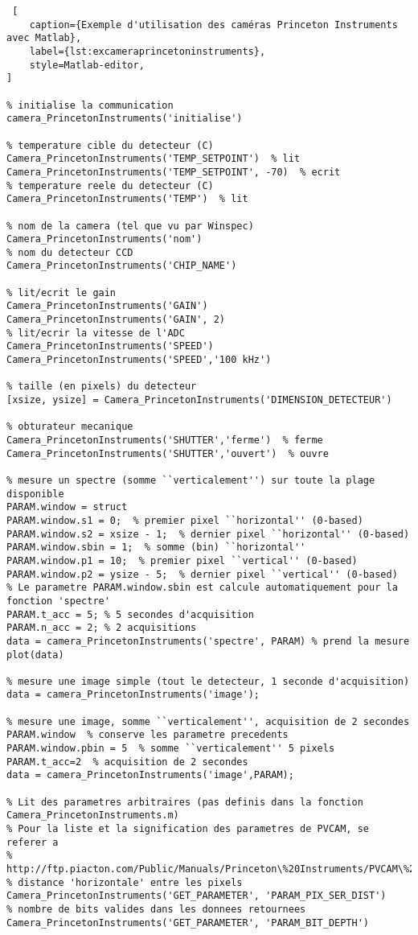 \documentclass[11pt,francais]{book} %
\begin{document}
\begin{lstlisting} [
    caption={Exemple d'utilisation des caméras Princeton Instruments avec Matlab},
    label={lst:excameraprincetoninstruments},
    style=Matlab-editor,
]

% initialise la communication
camera_PrincetonInstruments('initialise')

% temperature cible du detecteur (C)
Camera_PrincetonInstruments('TEMP_SETPOINT')  % lit
Camera_PrincetonInstruments('TEMP_SETPOINT', -70)  % ecrit
% temperature reele du detecteur (C)
Camera_PrincetonInstruments('TEMP')  % lit

% nom de la camera (tel que vu par Winspec)
Camera_PrincetonInstruments('nom')
% nom du detecteur CCD
Camera_PrincetonInstruments('CHIP_NAME')

% lit/ecrit le gain
Camera_PrincetonInstruments('GAIN')
Camera_PrincetonInstruments('GAIN', 2)
% lit/ecrir la vitesse de l'ADC
Camera_PrincetonInstruments('SPEED')
Camera_PrincetonInstruments('SPEED','100 kHz')

% taille (en pixels) du detecteur
[xsize, ysize] = Camera_PrincetonInstruments('DIMENSION_DETECTEUR')

% obturateur mecanique
Camera_PrincetonInstruments('SHUTTER','ferme')  % ferme
Camera_PrincetonInstruments('SHUTTER','ouvert')  % ouvre

% mesure un spectre (somme ``verticalement'') sur toute la plage disponible
PARAM.window = struct
PARAM.window.s1 = 0;  % premier pixel ``horizontal'' (0-based)
PARAM.window.s2 = xsize - 1;  % dernier pixel ``horizontal'' (0-based)
PARAM.window.sbin = 1;  % somme (bin) ``horizontal''
PARAM.window.p1 = 10;  % premier pixel ``vertical'' (0-based)
PARAM.window.p2 = ysize - 5;  % dernier pixel ``vertical'' (0-based)
% Le parametre PARAM.window.sbin est calcule automatiquement pour la fonction 'spectre'
PARAM.t_acc = 5; % 5 secondes d'acquisition
PARAM.n_acc = 2; % 2 acquisitions
data = camera_PrincetonInstruments('spectre', PARAM) % prend la mesure
plot(data)

% mesure une image simple (tout le detecteur, 1 seconde d'acquisition)
data = camera_PrincetonInstruments('image');

% mesure une image, somme ``verticalement'', acquisition de 2 secondes
PARAM.window  % conserve les parametre precedents
PARAM.window.pbin = 5  % somme ``verticalement'' 5 pixels
PARAM.t_acc=2  % acquisition de 2 secondes
data = camera_PrincetonInstruments('image',PARAM);

% Lit des parametres arbitraires (pas definis dans la fonction Camera_PrincetonInstruments.m)
% Pour la liste et la signification des parametres de PVCAM, se referer a
%  http://ftp.piacton.com/Public/Manuals/Princeton\%20Instruments/PVCAM\%202.7\%20Software\%20User\%20Manual.pdf
% distance 'horizontale' entre les pixels
Camera_PrincetonInstruments('GET_PARAMETER', 'PARAM_PIX_SER_DIST')
% nombre de bits valides dans les donnees retournees
Camera_PrincetonInstruments('GET_PARAMETER', 'PARAM_BIT_DEPTH')


\end{lstlisting}
\end{document}
